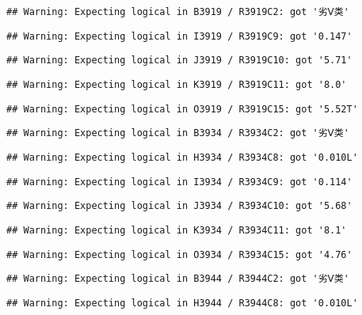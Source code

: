 \documentclass[
]{article}
\begin{document}
\begin{verbatim}
## Warning: Expecting logical in B3919 / R3919C2: got '劣Ⅴ类'
\end{verbatim}

\begin{verbatim}
## Warning: Expecting logical in I3919 / R3919C9: got '0.147'
\end{verbatim}

\begin{verbatim}
## Warning: Expecting logical in J3919 / R3919C10: got '5.71'
\end{verbatim}

\begin{verbatim}
## Warning: Expecting logical in K3919 / R3919C11: got '8.0'
\end{verbatim}

\begin{verbatim}
## Warning: Expecting logical in O3919 / R3919C15: got '5.52T'
\end{verbatim}

\begin{verbatim}
## Warning: Expecting logical in B3934 / R3934C2: got '劣Ⅴ类'
\end{verbatim}

\begin{verbatim}
## Warning: Expecting logical in H3934 / R3934C8: got '0.010L'
\end{verbatim}

\begin{verbatim}
## Warning: Expecting logical in I3934 / R3934C9: got '0.114'
\end{verbatim}

\begin{verbatim}
## Warning: Expecting logical in J3934 / R3934C10: got '5.68'
\end{verbatim}

\begin{verbatim}
## Warning: Expecting logical in K3934 / R3934C11: got '8.1'
\end{verbatim}

\begin{verbatim}
## Warning: Expecting logical in O3934 / R3934C15: got '4.76'
\end{verbatim}

\begin{verbatim}
## Warning: Expecting logical in B3944 / R3944C2: got '劣Ⅴ类'
\end{verbatim}

\begin{verbatim}
## Warning: Expecting logical in H3944 / R3944C8: got '0.010L'
\end{verbatim}
\end{document}
